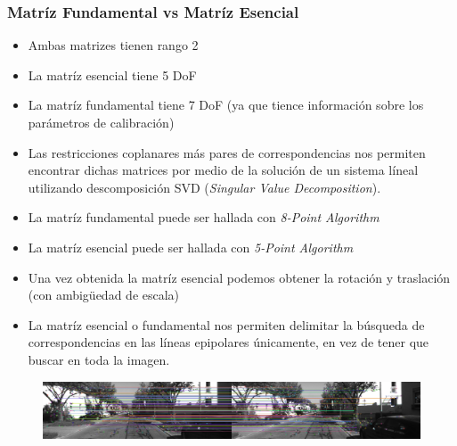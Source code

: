 \begin{frame}
	\frametitle{Matríz Fundamental vs Matríz Esencial}
	\footnotesize
	
	\begin{itemize}
		\item Ambas matrizes tienen rango 2
		\item La matríz esencial tiene 5 DoF
		\item La matríz fundamental tiene 7 DoF (ya que tience información sobre los parámetros de calibración)
		\item Las restricciones coplanares más pares de correspondencias nos permiten encontrar dichas matrices por medio de la solución de un sistema líneal utilizando descomposición SVD (\emph{Singular Value Decomposition}).
		\item La matríz fundamental puede ser hallada con \emph{8-Point Algorithm}
		\item La matríz esencial puede ser hallada con \emph{5-Point Algorithm}
		\item Una vez obtenida la matríz esencial podemos obtener la rotación y traslación (con ambig{\"u}edad de escala)
		\item La matríz esencial o fundamental nos permiten delimitar la búsqueda de correspondencias en las líneas epipolares únicamente, en vez de tener que buscar en toda la imagen.
	\end{itemize}

	\begin{figure}
		\includegraphics[width=\textwidth]{./images/stereo_matches.pdf}
	\end{figure}
	
\end{frame}



